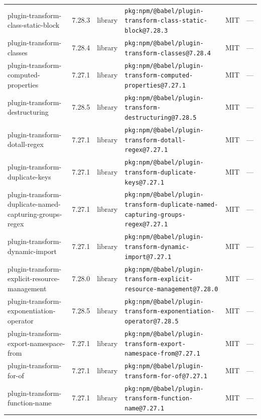 \documentclass[11pt,a4paper]{article}
\begin{document}
\begin{longtable}{|p{4cm}|p{2cm}|p{1.6cm}|p{5cm}|p{1.5cm}|p{3.5cm}|}
\raggedright plugin-transform-class-static-block & 7.28.3 & library & \small\texttt{pkg:npm/@babel/plugin-transform-class-static-block@7.28.3} & MIT & \small — \\
\raggedright plugin-transform-classes & 7.28.4 & library & \small\texttt{pkg:npm/@babel/plugin-transform-classes@7.28.4} & MIT & \small — \\
\raggedright plugin-transform-computed-properties & 7.27.1 & library & \small\texttt{pkg:npm/@babel/plugin-transform-computed-properties@7.27.1} & MIT & \small — \\
\raggedright plugin-transform-destructuring & 7.28.5 & library & \small\texttt{pkg:npm/@babel/plugin-transform-destructuring@7.28.5} & MIT & \small — \\
\raggedright plugin-transform-dotall-regex & 7.27.1 & library & \small\texttt{pkg:npm/@babel/plugin-transform-dotall-regex@7.27.1} & MIT & \small — \\
\raggedright plugin-transform-duplicate-keys & 7.27.1 & library & \small\texttt{pkg:npm/@babel/plugin-transform-duplicate-keys@7.27.1} & MIT & \small — \\
\raggedright plugin-transform-duplicate-named-capturing-groups-regex & 7.27.1 & library & \small\texttt{pkg:npm/@babel/plugin-transform-duplicate-named-capturing-groups-regex@7.27.1} & MIT & \small — \\
\raggedright plugin-transform-dynamic-import & 7.27.1 & library & \small\texttt{pkg:npm/@babel/plugin-transform-dynamic-import@7.27.1} & MIT & \small — \\
\raggedright plugin-transform-explicit-resource-management & 7.28.0 & library & \small\texttt{pkg:npm/@babel/plugin-transform-explicit-resource-management@7.28.0} & MIT & \small — \\
\raggedright plugin-transform-exponentiation-operator & 7.28.5 & library & \small\texttt{pkg:npm/@babel/plugin-transform-exponentiation-operator@7.28.5} & MIT & \small — \\
\raggedright plugin-transform-export-namespace-from & 7.27.1 & library & \small\texttt{pkg:npm/@babel/plugin-transform-export-namespace-from@7.27.1} & MIT & \small — \\
\raggedright plugin-transform-for-of & 7.27.1 & library & \small\texttt{pkg:npm/@babel/plugin-transform-for-of@7.27.1} & MIT & \small — \\
\raggedright plugin-transform-function-name & 7.27.1 & library & \small\texttt{pkg:npm/@babel/plugin-transform-function-name@7.27.1} & MIT & \small — \\

\end{longtable}
\end{document}
